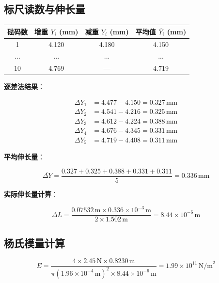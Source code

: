 \documentclass[12pt,a4paper]{article}
\begin{document}
\subsection{标尺读数与伸长量}

\begin{table}[H]
\centering
\begin{tabular}{|c|c|c|c|}
\hline
砝码数 & 增重 $Y_i$ (mm) & 减重 $Y_i$ (mm) & 平均值 $\overline{Y_i}$ (mm) \\
\hline
1 & 4.120 & 4.180 & 4.150 \\
\hline
... & ... & ... & ... \\
\hline
10 & 4.769 & — & 4.719 \\
\hline
\end{tabular}
\end{table}

\textbf{逐差法结果}：

\begin{align}
\Delta Y_1 &= 4.477 - 4.150 = 0.327 \, \text{mm} \\
\Delta Y_2 &= 4.541 - 4.216 = 0.325 \, \text{mm} \\
\Delta Y_3 &= 4.612 - 4.224 = 0.388 \, \text{mm} \\
\Delta Y_4 &= 4.676 - 4.345 = 0.331 \, \text{mm} \\
\Delta Y_5 &= 4.719 - 4.408 = 0.311 \, \text{mm}
\end{align}

\textbf{平均伸长量}：

\begin{equation}
\overline{\Delta Y} = \frac{0.327 + 0.325 + 0.388 + 0.331 + 0.311}{5} = 0.336 \, \text{mm}
\end{equation}

\textbf{实际伸长量计算}：

\begin{equation}
\Delta L = \frac{0.07532 \, \text{m} \times 0.336 \times 10^{-3} \, \text{m}}{2 \times 1.502 \, \text{m}} = 8.44 \times 10^{-6} \, \text{m}
\end{equation}

\subsection{杨氏模量计算}

\begin{equation}
E = \frac{4 \times 2.45 \, \text{N} \times 0.8230 \, \text{m}}{\pi (1.96 \times 10^{-4} \, \text{m})^2 \times 8.44 \times 10^{-6} \, \text{m}} = 1.99 \times 10^{11} \, \text{N/m}^2
\end{equation}
\end{document}
